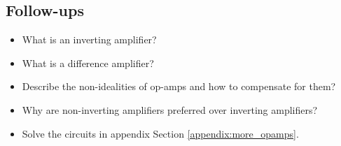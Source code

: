 \documentclass[main.tex]{subfiles}
\begin{document}




\subsection{Follow-ups}
\begin{itemize}
    \item What is an inverting amplifier?
    \item What is a difference amplifier?
    \item Describe the non-idealities of op-amps and how to compensate for them? %
    \item Why are non-inverting amplifiers preferred over inverting amplifiers? %
    \item Solve the circuits in appendix Section \ref{appendix:more_opamps}. 
\end{itemize}
\end{document}
